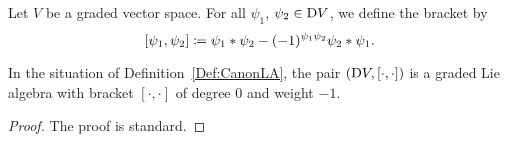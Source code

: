 \documentclass[\MainFolder/Text.tex]{subfiles}
\begin{document}
\begin{Definition}\label{Def:CanonLA}
Let $V$ be a graded vector space. For all $\psi_1$, $\psi_2 \in \mathrm{D} V$, we define the bracket by
$$ [\psi_1, \psi_2] \coloneqq \psi_1 * \psi_2 - (-1)^{\psi_1 \psi_2} \psi_2 * \psi_1. $$
\end{Definition}
\begin{Proposition}\label{Prop:CanonLA}
In the situation of Definition~\ref{Def:CanonLA}, the pair $(\mathrm{D} V,[\cdot,\cdot])$ is a graded Lie algebra with bracket $[\cdot,\cdot]$ of degree $0$ and weight $-1$.
\end{Proposition}
\begin{proof}
The proof is standard.
\end{proof}
\end{document}
